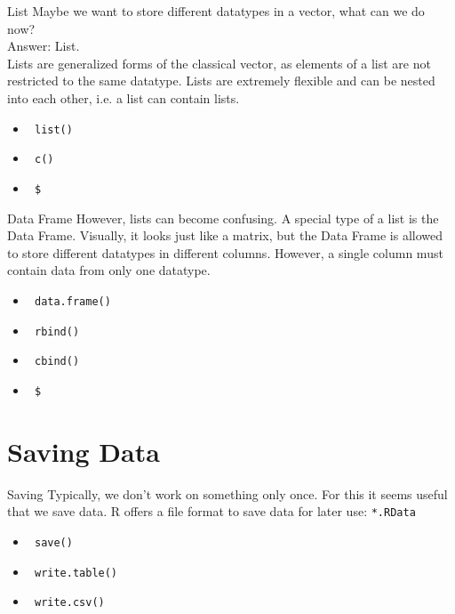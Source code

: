 \documentclass[aspectratio = 169]{chariteBeamer}
\begin{document}
\begin{frame}[fragile]{List}
	Maybe we want to store different datatypes in a vector, what can we do now?\\
	Answer: List.\\
	Lists are generalized forms of the classical vector, as elements of a list are not restricted to the same datatype. Lists are extremely flexible and can be nested into each other, i.e. a list can contain lists.
	\begin{itemize}
		\item \verb+ list()+
		\item \verb+ c()+
		\item \verb+ $ +
	\end{itemize}
\end{frame}

\begin{frame}[fragile]{Data Frame}
	However, lists can become confusing. A special type of a list is the Data Frame.
	Visually, it looks just like a matrix, but the Data Frame is allowed to store different datatypes in different columns. However, a single column must contain data from only one datatype.
	\begin{itemize}
		\item \verb+ data.frame()+
		\item \verb+ rbind()+
		\item \verb+ cbind()+
		\item \verb+ $+
	\end{itemize}
\end{frame}

\section{Saving Data}

\begin{frame}[fragile]{Saving}
	Typically, we don't work on something only once. For this it seems useful that we save data. R offers a file format to save data for later use: \verb+*.RData+
	\begin{itemize}
		\item \verb+ save()+
		\item \verb+ write.table()+
		\item \verb+ write.csv()+
	\end{itemize}
\end{frame}
\end{document}
